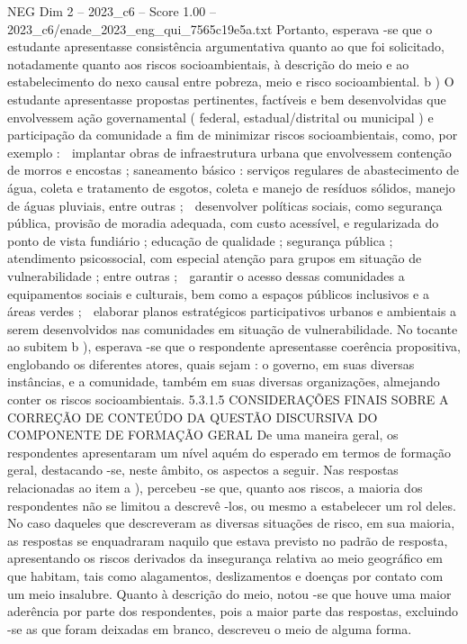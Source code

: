 \begin{textsample}{NEG Dim 2 – 2023\_c6 – Score 1.00 – 2023\_c6/enade\_2023\_eng\_qui\_7565c19e5a.txt}
Portanto, esperava -se que o estudante apresentasse consistência argumentativa quanto ao que foi solicitado, notadamente quanto aos riscos socioambientais, à descrição do meio e ao estabelecimento do nexo causal entre pobreza, meio e risco socioambiental. b ) O estudante apresentasse propostas pertinentes, factíveis e bem desenvolvidas que envolvessem ação governamental ( federal, estadual/distrital ou municipal ) e participação da comunidade a fim de minimizar riscos socioambientais, como, por exemplo :  implantar obras de infraestrutura urbana que envolvessem contenção de morros e encostas ; saneamento básico : serviços regulares de abastecimento de água, coleta e tratamento de esgotos, coleta e manejo de resíduos sólidos, manejo de águas pluviais, entre outras ;  desenvolver políticas sociais, como segurança pública, provisão de moradia adequada, com custo acessível, e regularizada do ponto de vista fundiário ; educação de qualidade ; segurança pública ; atendimento psicossocial, com especial atenção para grupos em situação de vulnerabilidade ; entre outras ;  garantir o acesso dessas comunidades a equipamentos sociais e culturais, bem como a espaços públicos inclusivos e a áreas verdes ;  elaborar planos estratégicos participativos urbanos e ambientais a serem desenvolvidos nas comunidades em situação de vulnerabilidade.
No tocante ao subitem b ), esperava -se que o respondente apresentasse coerência propositiva, englobando os diferentes atores, quais sejam : o governo, em suas diversas instâncias, e a comunidade, também em suas diversas organizações, almejando conter os riscos socioambientais. 5.3.1.5 CONSIDERAÇÕES FINAIS SOBRE A CORREÇÃO DE CONTEÚDO DA QUESTÃO DISCURSIVA DO COMPONENTE DE FORMAÇÃO GERAL De uma maneira geral, os respondentes apresentaram um nível aquém do esperado em termos de formação geral, destacando -se, neste âmbito, os aspectos a seguir.
Nas respostas relacionadas ao item a ), percebeu -se que, quanto aos riscos, a maioria dos respondentes não se limitou a descrevê -los, ou mesmo a estabelecer um rol deles.
No caso daqueles que descreveram as diversas situações de risco, em sua maioria, as respostas se enquadraram naquilo que estava previsto no padrão de resposta, apresentando os riscos derivados da insegurança relativa ao meio geográfico em que habitam, tais como alagamentos, deslizamentos e doenças por contato com um meio insalubre.
Quanto à descrição do meio, notou -se que houve uma maior aderência por parte dos respondentes, pois a maior parte das respostas, excluindo -se as que foram deixadas em branco, descreveu o meio de alguma forma.

\end{textsample}
